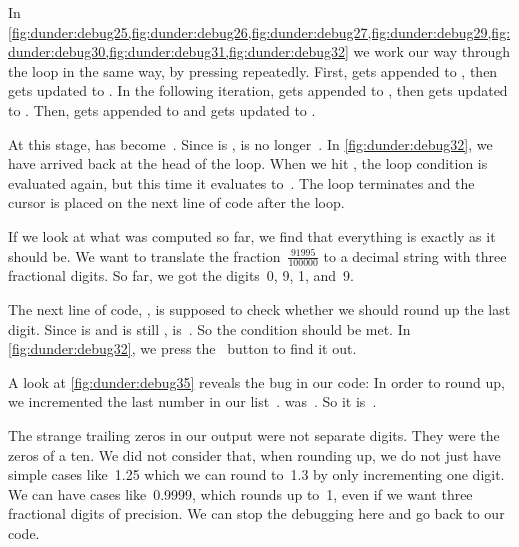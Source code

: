 In \cref{fig:dunder:debug25,fig:dunder:debug26,fig:dunder:debug27,fig:dunder:debug29,fig:dunder:debug30,fig:dunder:debug31,fig:dunder:debug32} we work our way through the loop in the same way, by pressing  repeatedly.
First,  gets appended to , then  gets updated to .
In the following iteration,  gets appended to , then  gets updated to .
Then,  gets appended to  and  gets updated to .

At this stage,  has become~\pythonil{[0, 9, 1, 9]}.
Since  is ,  is no longer~.
In \cref{fig:dunder:debug32}, we have arrived back at the head of the loop.
When we hit , the loop condition is evaluated again, but this time it evaluates to~.
The loop terminates and the cursor is placed on the next line of code after the loop.

If we look at what was computed so far, we find that everything is exactly as it should be.
We want to translate the fraction~$\frac{91995}{100000}$ to a decimal string with three fractional digits.
So far, we got the digits~0, 9, 1, and~9.

The next line of code, , is supposed to check whether we should round up the last digit.
Since  is  and  is still ,  is~.
So the condition should be met.
In \cref{fig:dunder:debug32}, we press the \pycharmDebuggerStepOver~button to find it out.

A look at \cref{fig:dunder:debug35} reveals the bug in our code:
In order to round up, we incremented the last number in our list~.
 was~\pythonil{[0, 9, 1, 9]}.
So it is~\pythonil{[0, 9, 1, 10]}.

The strange trailing zeros in our output were not separate digits.
They were the zeros of a ten.
We did not consider that, when rounding up, we do not just have simple cases like~1.25 which we can round to~1.3 by only incrementing one digit.
We can have cases like~0.9999, which rounds up to~1, even if we want three fractional digits of precision.
We can stop the debugging here and go back to our code.%
\clearpage%
%
%
%

